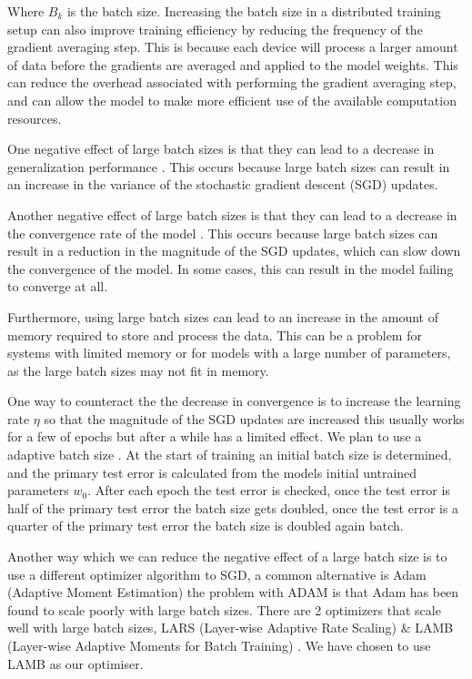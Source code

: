 \documentclass[twocolumn,10pt]{article}
\begin{document}
Where $B_k$ is the batch size. Increasing the batch size in a distributed training setup can also improve training efficiency by reducing the frequency of the gradient averaging step. This is because each device will process a larger amount of data before the gradients are averaged and applied to the model weights. This can reduce the overhead associated with performing the gradient averaging step, and can allow the model to make more efficient use of the available computation resources.

One negative effect of large batch sizes is that they can lead to a decrease in generalization performance \cite{keskar2016large}. This occurs because large batch sizes can result in an increase in the variance of the stochastic gradient descent (SGD) updates.

Another negative effect of large batch sizes is that they can lead to a decrease in the convergence rate of the model \cite{goyal2017accurate}. This occurs because large batch sizes can result in a reduction in the magnitude of the SGD updates, which can slow down the convergence of the model. In some cases, this can result in the model failing to converge at all.

Furthermore, using large batch sizes can lead to an increase in the amount of memory required to store and process the data. This can be a problem for systems with limited memory or for models with a large number of parameters, as the large batch sizes may not fit in memory.

One way to counteract the the decrease in convergence is to increase the learning rate $\eta$ \cite{goyal2017accurate} so that the magnitude of the SGD updates are increased this usually works for a few of epochs but after a while has a limited effect. We plan to use a adaptive batch size \cite{devarakonda2017adabatch}. At the start of training an initial batch size is determined, and the primary test error is calculated from the models initial untrained parameters $w_0$. After each epoch the test error is checked, once the test error is half of the primary test error the batch size gets doubled, once the test error is a quarter of the primary test error the batch size is doubled again batch.

Another way which we can reduce the negative effect of a large batch size is to use a different optimizer algorithm to SGD, a common alternative is Adam (Adaptive Moment Estimation) \cite{kingma2014adam} the problem with ADAM is that Adam has been found to scale poorly with large batch sizes. There are 2 optimizers that scale well with large batch sizes, LARS (Layer-wise Adaptive Rate Scaling) \cite{you2017scaling} \& LAMB (Layer-wise Adaptive Moments for Batch Training) \cite{you2019large}. We have chosen to use LAMB as our optimiser. 
\end{document}
